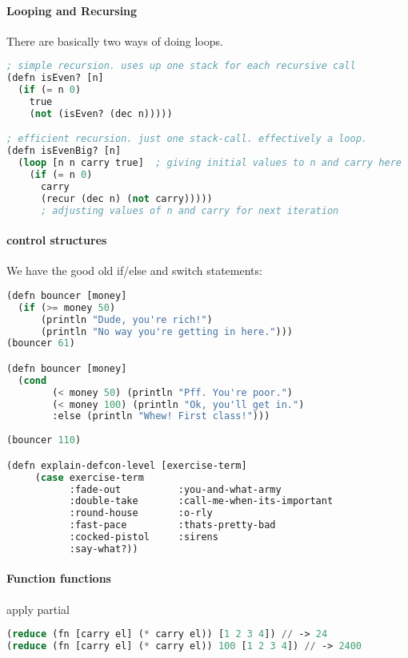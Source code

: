 \paragraph{Looping and Recursing} There are basically two ways of doing loops.

\begin{lstlisting}[language=lisp]
; simple recursion. uses up one stack for each recursive call
(defn isEven? [n]
  (if (= n 0)
    true
    (not (isEven? (dec n)))))

; efficient recursion. just one stack-call. effectively a loop.
(defn isEvenBig? [n]
  (loop [n n carry true]  ; giving initial values to n and carry here 
    (if (= n 0)
      carry
      (recur (dec n) (not carry)))))
      ; adjusting values of n and carry for next iteration
\end{lstlisting}


\paragraph{control structures} We have the good old if/else and switch statements: 
\begin{lstlisting}[language=lisp]
(defn bouncer [money]
  (if (>= money 50) 
      (println "Dude, you're rich!")
      (println "No way you're getting in here.")))
(bouncer 61)

(defn bouncer [money]
  (cond 
        (< money 50) (println "Pff. You're poor.")
        (< money 100) (println "Ok, you'll get in.")
        :else (println "Whew! First class!")))
      
(bouncer 110)

(defn explain-defcon-level [exercise-term]
     (case exercise-term
           :fade-out          :you-and-what-army
           :double-take       :call-me-when-its-important
           :round-house       :o-rly
           :fast-pace         :thats-pretty-bad
           :cocked-pistol     :sirens
           :say-what?))
\end{lstlisting}

\paragraph{Function functions}
apply
partial
\begin{lstlisting}[language=lisp]
(reduce (fn [carry el] (* carry el)) [1 2 3 4]) // -> 24
(reduce (fn [carry el] (* carry el)) 100 [1 2 3 4]) // -> 2400
\end{lstlisting}


